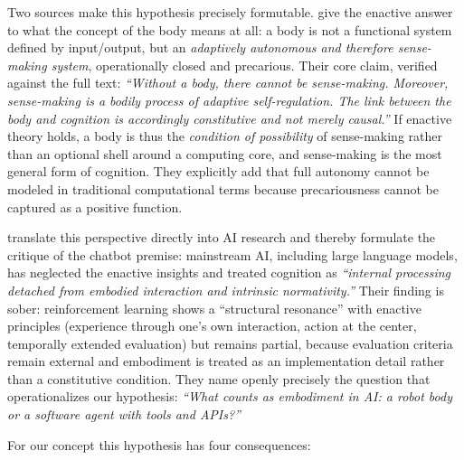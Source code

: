 \documentclass[acmlarge, nonacm]{acmart}
\begin{document}
Two sources make this hypothesis precisely formutable. \citet{dipaolothompson2024} give the enactive answer to what the concept of the body means at all: a body is not a functional system defined by input/output, but an \textit{adaptively autonomous and therefore sense-making system}, operationally closed and precarious. Their core claim, verified against the full text: \textit{``Without a body, there cannot be sense-making. Moreover, sense-making is a bodily process of adaptive self-regulation. The link between the body and cognition is accordingly constitutive and not merely causal.''} If enactive theory holds, a body is thus the \textit{condition of possibility} of sense-making rather than an optional shell around a computing core, and sense-making is the most general form of cognition. They explicitly add that full autonomy cannot be modeled in traditional computational terms because precariousness cannot be captured as a positive function.

\citet{rafieesutton2026} translate this perspective directly into AI research and thereby formulate the critique of the chatbot premise: mainstream AI, including large language models, has neglected the enactive insights and treated cognition as \textit{``internal processing detached from embodied interaction and intrinsic normativity.''} Their finding is sober: reinforcement learning shows a ``structural resonance'' with enactive principles (experience through one's own interaction, action at the center, temporally extended evaluation) but remains partial, because evaluation criteria remain external and embodiment is treated as an implementation detail rather than a constitutive condition. They name openly precisely the question that operationalizes our hypothesis: \textit{``What counts as embodiment in AI: a robot body or a software agent with tools and APIs?''}

For our concept this hypothesis has four consequences:
\end{document}
